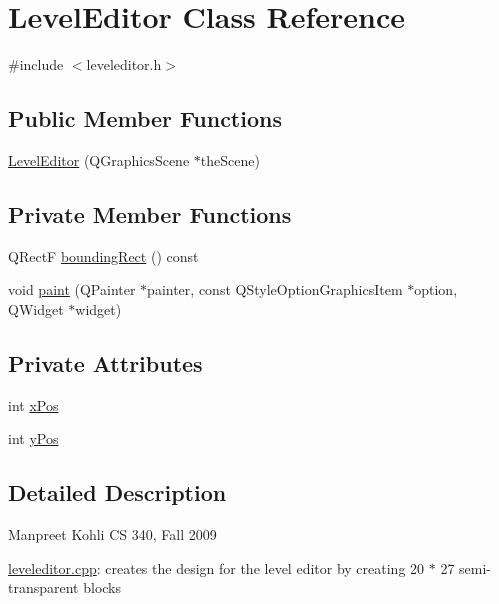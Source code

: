 \hypertarget{class_level_editor}{
\section{LevelEditor Class Reference}
\label{class_level_editor}
}


{\ttfamily \#include $<$leveleditor.h$>$}\subsection*{Public Member Functions}
\begin{DoxyCompactItemize}
\item 
\hyperlink{class_level_editor_a1d91bc06c0a93456587434b37fe726b4}{LevelEditor} (QGraphicsScene $\ast$theScene)
\end{DoxyCompactItemize}
\subsection*{Private Member Functions}
\begin{DoxyCompactItemize}
\item 
QRectF \hyperlink{class_level_editor_a24ac36387e7530e9b1a1a783657ca36e}{boundingRect} () const 
\item 
void \hyperlink{class_level_editor_a95f1903a2fbfd21e3fa60038d8248779}{paint} (QPainter $\ast$painter, const QStyleOptionGraphicsItem $\ast$option, QWidget $\ast$widget)
\end{DoxyCompactItemize}
\subsection*{Private Attributes}
\begin{DoxyCompactItemize}
\item 
int \hyperlink{class_level_editor_a39baf685b6e94984721a0df846316bdf}{xPos}
\item 
int \hyperlink{class_level_editor_a0d9ec2020a126ae5bdee4f442e1dd628}{yPos}
\end{DoxyCompactItemize}


\subsection{Detailed Description}
Manpreet Kohli CS 340, Fall 2009

\hyperlink{leveleditor_8cpp}{leveleditor.cpp}: creates the design for the level editor by creating 20 $\ast$ 27 semi-\/transparent blocks 

